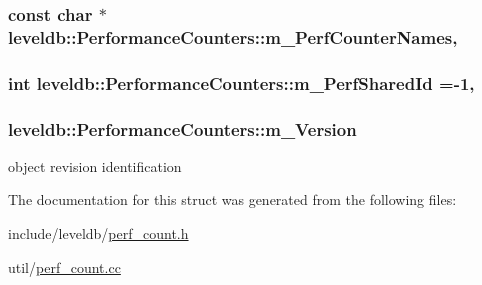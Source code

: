 \subsubsection[{m\+\_\+\+Perf\+Counter\+Names}]{\setlength{\rightskip}{0pt plus 5cm}const char $\ast$ leveldb\+::\+Performance\+Counters\+::m\+\_\+\+Perf\+Counter\+Names\hspace{0.3cm}{\ttfamily [static]}, {\ttfamily [protected]}}\label{structleveldb_1_1_performance_counters_a0d494602f6e67dd9a869e952aad5d927}
\hypertarget{structleveldb_1_1_performance_counters_a67299bcd8e76cd7c71331423b4bfbc7f}{}
\subsubsection[{m\+\_\+\+Perf\+Shared\+Id}]{\setlength{\rightskip}{0pt plus 5cm}int leveldb\+::\+Performance\+Counters\+::m\+\_\+\+Perf\+Shared\+Id =-\/1\hspace{0.3cm}{\ttfamily [static]}, {\ttfamily [protected]}}\label{structleveldb_1_1_performance_counters_a67299bcd8e76cd7c71331423b4bfbc7f}
\hypertarget{structleveldb_1_1_performance_counters_a4482b82212c3ce6245d0417f815fa745}{}
\subsubsection[{m\+\_\+\+Version}]{ leveldb\+::\+Performance\+Counters\+::m\+\_\+\+Version\hspace{0.3cm}{\ttfamily [protected]}}\label{structleveldb_1_1_performance_counters_a4482b82212c3ce6245d0417f815fa745}


object revision identification 



The documentation for this struct was generated from the following files\+:\begin{DoxyCompactItemize}
\item 
include/leveldb/\hyperlink{perf__count_8h}{perf\+\_\+count.\+h}\item 
util/\hyperlink{perf__count_8cc}{perf\+\_\+count.\+cc}\end{DoxyCompactItemize}
